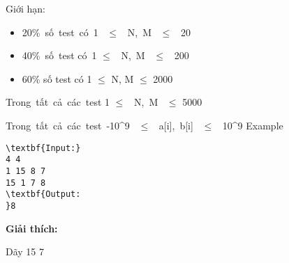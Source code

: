 Giới hạn:
\begin{itemize}
	\item 20\% số test có 1  $\le$  N, M  $\le$  20
	\item 40\% số test có 1  $\le$  N, M  $\le$  200
	\item 60\% số test có 1  $\le$  N, M  $\le$  2000
\end{itemize}

Trong tất cả các test 1 $\le$  N, M  $\le$  5000

Trong tất cả các test -10^9  $\le$  a[i], b[i]  $\le$  10^9
Example
\begin{verbatim}
\textbf{Input:} 
4 4
1 15 8 7
15 1 7 8 
\textbf{Output:
}8\end{verbatim}

\textbf{Giải thích:}

Dãy 15 7
